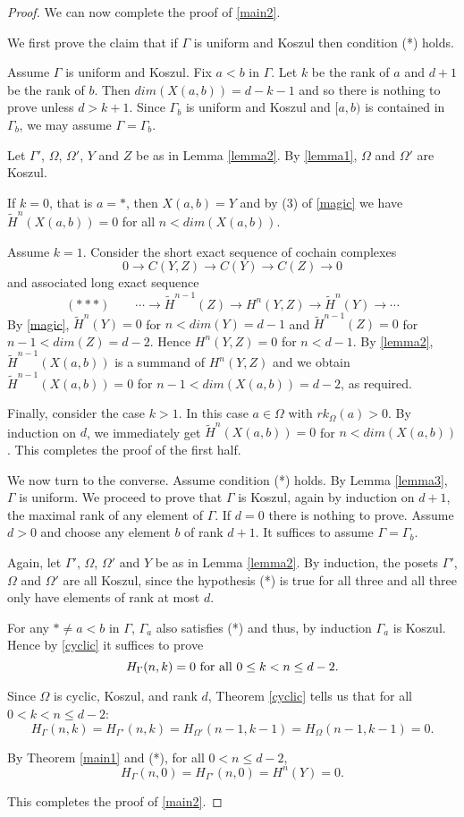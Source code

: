 \documentclass[11pt,righttag]{amsart}
\theoremstyle{definition}
\begin{document}
\begin{proof}
We can now complete the proof of \ref{main2}. 

We first prove the claim that if $\Gamma$ is uniform and Koszul then condition (*) holds.  

Assume $\Gamma$ is uniform and Koszul.  Fix $a<b$ in $\Gamma$. Let $k$ be the rank of 
$a$ and $d+1$ be the rank of $b$.  Then $dim(X(a,b)) =d-k-1$ and so there is nothing to prove unless $d>k+1$.  Since $\Gamma_b$ is uniform and Koszul and $[a,b)$ is contained in $\Gamma_b$, we may assume $\Gamma = \Gamma_b$.  

Let $\Gamma'$, $\Omega$, $\Omega'$, $Y$ and $Z$ be as in Lemma
\ref{lemma2}.  By \ref{lemma1},  $\Omega$ and $\Omega'$ are Koszul.

If $k=0$, that is $a=*$, then $X(a,b) = Y$ and by (3) of \ref{magic}  we have
$\tilde H^n(X(a,b)) = 0$ for all $n<  dim(X(a,b))$.  

Assume $k=1$.  Consider the short exact sequence of cochain complexes
$$0\to C(Y,Z) \to C(Y) \to C(Z) \to 0$$
and associated long exact sequence
$$(***)\qquad \cdots\to \tilde H^{n-1}(Z) \to H^n(Y,Z)\to \tilde H^n(Y) \to \cdots$$
By \ref{magic}, $\tilde H^n(Y) = 0$ for $n<dim(Y) = d-1$ and $\tilde H^{n-1}(Z) = 0$ 
for $n-1<dim(Z)=d-2$.  Hence $H^n(Y,Z)=0$ for $n<d-1$.  By \ref{lemma2}, $\tilde H^{n-1}(X(a,b))$ is a summand of 
$H^n(Y,Z)$ and we obtain $\tilde H^{n-1}(X(a,b))=0$ for $n-1<dim(X(a,b)) = d-2$, as required.

Finally, consider the case $k>1$.  In this case $a\in \Omega$ with 
$rk_\Omega(a)>0$.  By induction on $d$, we immediately get 
$\tilde H^n(X(a,b)) = 0$ for $n<dim(X(a,b))$.  This completes the proof of the first half.

We now turn to the converse. Assume condition (*) holds.  By Lemma \ref{lemma3}, $\Gamma$ is uniform.  We proceed to prove that $\Gamma$ is Koszul, again by induction on 
$d+1$, the maximal rank of any element of $\Gamma$.  If $d=0$ there is nothing to prove.  Assume $d>0$ and choose any element 
$b$ of rank $d+1$.  It suffices to assume $\Gamma=\Gamma_b$.  

Again, let $\Gamma'$, $\Omega$, $\Omega'$ and $Y$ be as 
in Lemma \ref{lemma2}.
By induction, the posets $\Gamma'$, $\Omega$ and $\Omega'$ are all Koszul, since the hypothesis (*) is true for all three and all three only have elements of rank at most $d$. 

For any $*\ne a<b$ in $\Gamma$, $\Gamma_a$ also satisfies (*) and thus, by induction $\Gamma_a$ is Koszul.  Hence by 
\ref{cyclic} it suffices to prove
 $$H_\Gamma(n,k) = 0 \hbox{ for all } 0\le k < n\le d-2.$$

Since $\Omega$ is cyclic, Koszul, and rank $d$, Theorem \ref{cyclic} tells us that for all  $0<k<n\le d-2$:
$$H_\Gamma(n,k) = H_{\Gamma'}(n,k) = H_{\Omega'}(n-1,k-1)=H_\Omega(n-1,k-1)=0.$$  

By Theorem \ref{main1} and (*), for all $0<n\le d-2$, 
$$H_\Gamma(n,0) = H_{\Gamma'}(n,0) = H^n(Y) = 0.$$  

This completes the proof of \ref{main2}.
\end{proof}
\end{document}
